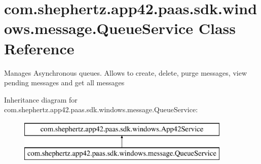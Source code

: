 \hypertarget{classcom_1_1shephertz_1_1app42_1_1paas_1_1sdk_1_1windows_1_1message_1_1_queue_service}{\section{com.\+shephertz.\+app42.\+paas.\+sdk.\+windows.\+message.\+Queue\+Service Class Reference}
\label{classcom_1_1shephertz_1_1app42_1_1paas_1_1sdk_1_1windows_1_1message_1_1_queue_service}
}


Manages Asynchronous queues. Allows to create, delete, purge messages, view pending messages and get all messages  


Inheritance diagram for com.\+shephertz.\+app42.\+paas.\+sdk.\+windows.\+message.\+Queue\+Service\+:\begin{figure}[H]
\begin{center}
\leavevmode
\includegraphics[height=2.000000cm]{classcom_1_1shephertz_1_1app42_1_1paas_1_1sdk_1_1windows_1_1message_1_1_queue_service}
\end{center}
\end{figure}

